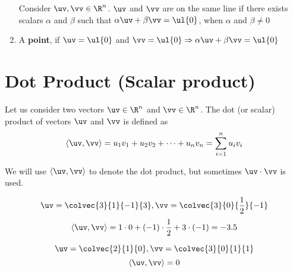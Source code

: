 \begin{example}
\begin{enumerate}
\begin{center}
\end{center}

\begin{note}
Consider $\uv,\vv\in\R^n$. $\uv$ and $\vv$ are on the same line if there exists scalars $\alpha$ and $\beta$ such that $\alpha\uv + \beta\vv = \ul{0}$, when $\alpha$ and $\beta\not=0$
\end{note}

\item A \textbf{point}, if $\uv=\ul{0}$ and $\vv=\ul{0}\Rightarrow\alpha\uv+\beta\vv = \ul{0}$

\end{enumerate}

\end{example}

\section{Dot Product (Scalar product)}

\begin{definition}
Let us consider two vectors $\uv\in\R^n$ and $\vv\in\R^n$. The dot (or scalar) product of vectors $\uv$ and $\vv$ is defined as
\[
\langle\uv,\vv\rangle = u_1v_1+u_2v_2+\dots+{u}_n{v}_n = \sum\limits^{n}_{i=1}u_iv_i
\]
\end{definition}

\begin{notation}
We will use $\langle\uv,\vv\rangle$ to denote the dot product, but sometimes $\uv\cdot\vv$ is used.
\end{notation}
\begin{example}
\[
\uv = \colvec{3}{1}{-1}{3}, \vv = \colvec{3}{0}{\frac{1}{2}}{-1}
\]
\[
\langle \uv,\vv\rangle = 1\cdot 0 + (-1)\cdot\frac{1}{2} + 3\cdot (-1) = -3.5
\]
\end{example}

\begin{example}
\[
\uv = \colvec{2}{1}{0}, \vv = \colvec{3}{0}{1}{1}
\]
\[
\langle\uv,\vv\rangle = 0
\]
\end{example}


